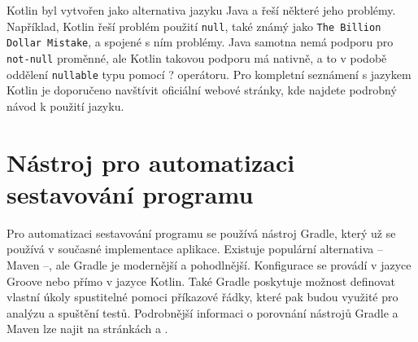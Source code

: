     Kotlin byl vytvořen jako alternativa jazyku Java a řeší některé jeho problémy. Například, Kotlin řeší problém použití \texttt{null}, také známý jako \texttt{The Billion Dollar Mistake}, a spojené s ním problémy. Java samotna nemá podporu pro \texttt{not-null} proměnné, ale Kotlin takovou podporu má nativně, a to v podobě oddělení \texttt{nullable} typu pomocí ? operátoru. Pro kompletní seznámení s jazykem Kotlin je doporučeno navštívit oficiální webové stránky, kde najdete podrobný návod k použití jazyku\cite{kotlin-documentation}.
    
    
    

\section{Nástroj pro automatizaci sestavování programu}\label{resere:build}
    Pro automatizaci sestavování programu se používá nástroj Gradle, který už se používá v současné implementace aplikace. Existuje populární alternativa -- Maven --, ale Gradle je modernější a pohodlnější. Konfigurace se provádí v jazyce Groove nebo přímo v jazyce Kotlin. Také Gradle poskytuje možnost definovat vlastní úkoly spustitelné pomoci příkazové řádky, které pak budou využité pro analýzu a spuštění testů. Podrobnější informaci o porovnání nástrojů Gradle a Maven lze najit na stránkách \cite{grale-vs-mavem} a \cite{gradle-vs-maven-bealsung}.

